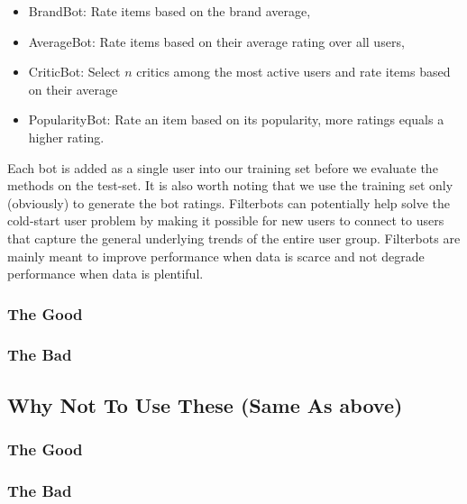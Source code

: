 \begin{itemize}
	\item BrandBot: Rate items based on the brand average,
	\item AverageBot: Rate items based on their average rating over all users,
	\item CriticBot: Select $n$ critics among the most active users and rate items based on their average
	\item PopularityBot: Rate an item based on its popularity, more ratings equals a higher rating.
\end{itemize}

Each bot is added as a single user into our training set before we evaluate the methods on the test-set.
It is also worth noting that we use the training set only (obviously) to generate the bot ratings.
Filterbots can potentially help solve the cold-start user problem by making it possible for new users to connect to users
that capture the general underlying trends of the entire user group. Filterbots are mainly meant to improve
performance when data is scarce and not degrade performance when data is plentiful.



\subsubsection{The Good}
\subsubsection{The Bad}
\subsection{Why Not To Use These (Same As above)}
\subsubsection{The Good}
\subsubsection{The Bad}
